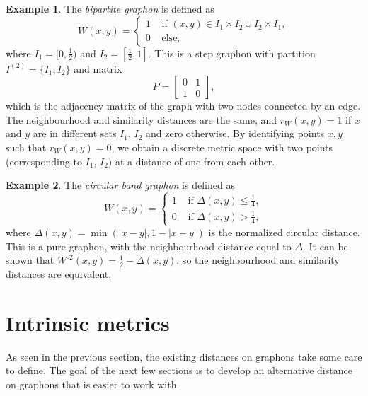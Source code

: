 \documentclass[11pt]{article}
\theoremstyle{definition}
\newtheorem{example}{Example}
\begin{document}
\begin{example} \label{ex:bipartite}
    The \textit{bipartite graphon} is defined as 
    $$ W(x,y) = \begin{cases}
        1 & \text{ if } (x,y) \in I_1 \times I_2 \cup I_2 \times I_1,\\
        0 & \text{ else},
    \end{cases} $$
    where $I_1 = [0,\frac{1}{2})$ and $I_2=[\frac{1}{2},1]$. This is a step graphon with partition $I^{(2)}=\{I_1,I_2\}$ and matrix
    $$ P = \begin{bmatrix}
        0 & 1\\ 1 & 0
    \end{bmatrix}, $$
    which is the adjacency matrix of the graph with two nodes connected by an edge. The neighbourhood and similarity distances are the same, and $r_W(x,y)=1$ if $x$ and $y$ are in different sets $I_1$, $I_2$ and zero otherwise. By identifying points $x,y$ such that $r_W(x,y)=0$, we obtain a discrete metric space with two points (corresponding to $I_1$, $I_2$) at a distance of one from each other.
\end{example}

\begin{example} \label{ex:circular-band}
    The \textit{circular band graphon} is defined as
    $$ W(x,y) = \begin{cases}
        1 & \text{ if } \Delta(x,y) \le \frac{1}{4},\\
        0 & \text{ if } \Delta(x,y) > \frac{1}{4},
    \end{cases} $$
    where $\Delta(x,y) = \min(|x-y|, 1-|x-y|)$ is the normalized circular distance. This is a pure graphon, with the neighbourhood distance equal to $\Delta$. It can be shown that $W^{\circ 2}(x,y) = \frac{1}{2}-\Delta(x,y)$, so the neighbourhood and similarity distances are equivalent.
\end{example}

\section{Intrinsic metrics}\label{sec:varadhan}

As seen in the previous section, the existing distances on graphons take some care to define. The goal of the next few sections is to develop an alternative distance on graphons that is easier to work with.
\end{document}
